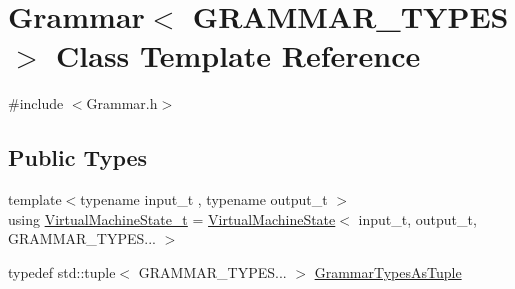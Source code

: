 \hypertarget{class_grammar}{}\section{Grammar$<$ G\+R\+A\+M\+M\+A\+R\+\_\+\+T\+Y\+P\+ES $>$ Class Template Reference}
\label{class_grammar}


{\ttfamily \#include $<$Grammar.\+h$>$}

\subsection*{Public Types}
\begin{DoxyCompactItemize}
\item 
{\footnotesize template$<$typename input\+\_\+t , typename output\+\_\+t $>$ }\\using \hyperlink{class_grammar_a30c2eaa4b378738686365fc6d8697f61}{Virtual\+Machine\+State\+\_\+t} = \hyperlink{class_virtual_machine_state}{Virtual\+Machine\+State}$<$ input\+\_\+t, output\+\_\+t, G\+R\+A\+M\+M\+A\+R\+\_\+\+T\+Y\+P\+E\+S... $>$
\item 
typedef std\+::tuple$<$ G\+R\+A\+M\+M\+A\+R\+\_\+\+T\+Y\+P\+E\+S... $>$ \hyperlink{class_grammar_a5ba44586d1c6f847cbbeeead91964e3c}{Grammar\+Types\+As\+Tuple}
\end{DoxyCompactItemize}

